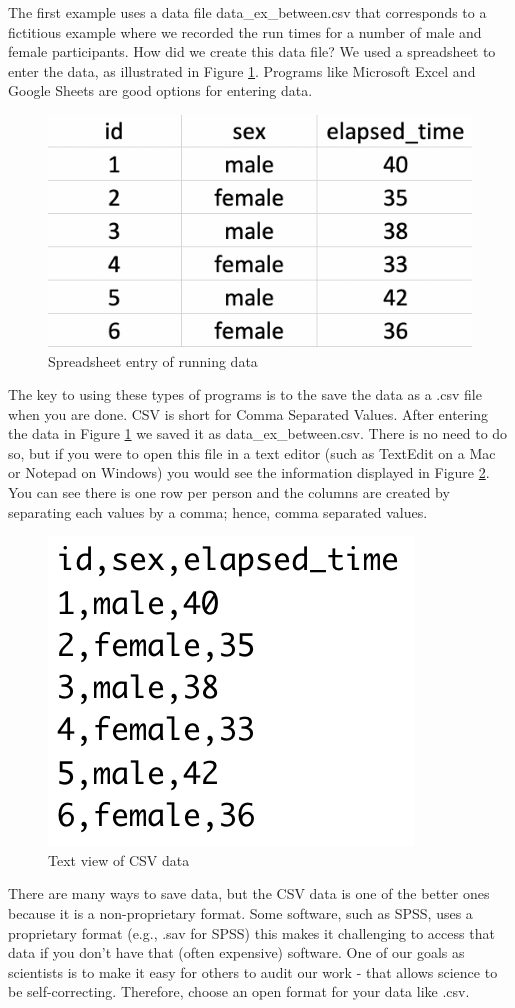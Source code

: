 \documentclass[
]{krantz}
\begin{document}
The first example uses a data file data\_ex\_between.csv that corresponds to a fictitious example where we recorded the run times for a number of male and female participants. How did we create this data file? We used a spreadsheet to enter the data, as illustrated in Figure \ref{fig:spreadsheetbetween}. Programs like Microsoft Excel and Google Sheets are good options for entering data.

\begin{figure}
\includegraphics[width=0.4\linewidth]{ch_enter_load/images/screenshot_data_between} \caption{Spreadsheet entry of running data}\label{fig:spreadsheetbetween}
\end{figure}

The key to using these types of programs is to the save the data as a .csv file when you are done. CSV is short for Comma Separated Values. After entering the data in Figure \ref{fig:spreadsheetbetween} we saved it as data\_ex\_between.csv. There is no need to do so, but if you were to open this file in a text editor (such as TextEdit on a Mac or Notepad on Windows) you would see the information displayed in Figure \ref{fig:csvsheetbetween}. You can see there is one row per person and the columns are created by separating each values by a comma; hence, comma separated values.

\begin{figure}
\includegraphics[width=0.25\linewidth]{ch_enter_load/images/screenshot_csv_between} \caption{Text view of CSV data}\label{fig:csvsheetbetween}
\end{figure}

There are many ways to save data, but the CSV data is one of the better ones because it is a non-proprietary format. Some software, such as SPSS, uses a proprietary format (e.g., .sav for SPSS) this makes it challenging to access that data if you don't have that (often expensive) software. One of our goals as scientists is to make it easy for others to audit our work - that allows science to be self-correcting. Therefore, choose an open format for your data like .csv.
\end{document}
